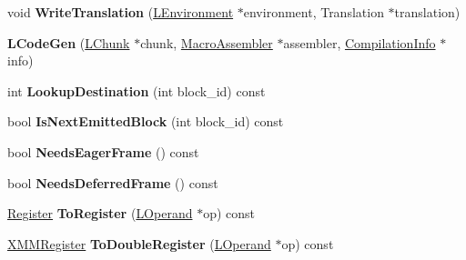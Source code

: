 \begin{DoxyCompactItemize}
\item 
void {\bfseries Write\+Translation} (\hyperlink{classv8_1_1internal_1_1_l_environment}{L\+Environment} $\ast$environment, Translation $\ast$translation)\hypertarget{classv8_1_1internal_1_1_l_code_gen_aa6c0dc6868c8926d71543f7d35675b7f}{}\label{classv8_1_1internal_1_1_l_code_gen_aa6c0dc6868c8926d71543f7d35675b7f}

\item 
{\bfseries L\+Code\+Gen} (\hyperlink{classv8_1_1internal_1_1_l_chunk}{L\+Chunk} $\ast$chunk, \hyperlink{classv8_1_1internal_1_1_macro_assembler}{Macro\+Assembler} $\ast$assembler, \hyperlink{classv8_1_1internal_1_1_compilation_info}{Compilation\+Info} $\ast$info)\hypertarget{classv8_1_1internal_1_1_l_code_gen_aed907f71b0a7b9401ce1c0c883ed449b}{}\label{classv8_1_1internal_1_1_l_code_gen_aed907f71b0a7b9401ce1c0c883ed449b}

\item 
int {\bfseries Lookup\+Destination} (int block\+\_\+id) const \hypertarget{classv8_1_1internal_1_1_l_code_gen_aed7b32e45855e787600f16ad151865c4}{}\label{classv8_1_1internal_1_1_l_code_gen_aed7b32e45855e787600f16ad151865c4}

\item 
bool {\bfseries Is\+Next\+Emitted\+Block} (int block\+\_\+id) const \hypertarget{classv8_1_1internal_1_1_l_code_gen_a679c74faee0e58ff843fdfa52dc927a9}{}\label{classv8_1_1internal_1_1_l_code_gen_a679c74faee0e58ff843fdfa52dc927a9}

\item 
bool {\bfseries Needs\+Eager\+Frame} () const \hypertarget{classv8_1_1internal_1_1_l_code_gen_a3487a9e332e1674eeac175bdd43851bd}{}\label{classv8_1_1internal_1_1_l_code_gen_a3487a9e332e1674eeac175bdd43851bd}

\item 
bool {\bfseries Needs\+Deferred\+Frame} () const \hypertarget{classv8_1_1internal_1_1_l_code_gen_aecf1941fcb8a169141d3e26237c64c67}{}\label{classv8_1_1internal_1_1_l_code_gen_aecf1941fcb8a169141d3e26237c64c67}

\item 
\hyperlink{structv8_1_1internal_1_1_register}{Register} {\bfseries To\+Register} (\hyperlink{classv8_1_1internal_1_1_l_operand}{L\+Operand} $\ast$op) const \hypertarget{classv8_1_1internal_1_1_l_code_gen_ab3dda8b86a7b8303006365eb51069db1}{}\label{classv8_1_1internal_1_1_l_code_gen_ab3dda8b86a7b8303006365eb51069db1}

\item 
\hyperlink{structv8_1_1internal_1_1_double_register}{X\+M\+M\+Register} {\bfseries To\+Double\+Register} (\hyperlink{classv8_1_1internal_1_1_l_operand}{L\+Operand} $\ast$op) const \hypertarget{classv8_1_1internal_1_1_l_code_gen_a40807ab5428a4c2bc619be6df1f01aaa}{}\label{classv8_1_1internal_1_1_l_code_gen_a40807ab5428a4c2bc619be6df1f01aaa}


\end{DoxyCompactItemize}
